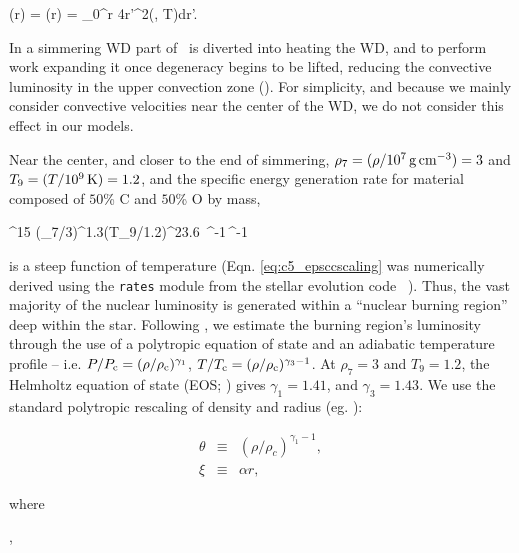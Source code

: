 \eqbegin
\Lconv(r) = \Lcc(r) = \int_0^{r} 4\pi r'^2\rho \epscc(\rho, T)dr'.
\label{eq:c5_convlum}
\eqend

\noindent In a simmering WD part of \Lcc\ is diverted into heating the WD, and to perform work expanding it once degeneracy begins to be lifted, reducing the convective luminosity in the upper convection zone (\citeal{piroc08}).  For simplicity, and because we mainly consider convective velocities near the center of the WD, we do not consider this effect in our models.  

Near the center, and closer to the end of simmering, $\rho_7 = (\rho/10^7\,\gcc) = 3$ and $T_9 = (T/10^9\,\mathrm{K}) = 1.2$, and the specific energy generation rate {\charles for material composed of $50$\% C and $50$\% O by mass,}

\eqbegin
\epscc {}^{15} \left(\rho_7/3\right)^{1.3}\left(T_9/1.2\right)^{23.6}\,\,\,^{-1}\,^{-1}
\label{eq:c5_epsccscaling}
\eqend

\noindent is a steep function of temperature (Eqn. \ref{eq:c5_epsccscaling} was numerically derived using the \texttt{rates} module from the stellar evolution code \mesa\ \citep{paxt+11}).  Thus, the vast majority of the nuclear luminosity is generated within a ``nuclear burning region'' deep within the star.  Following \citeal{wooswk04}, we estimate the burning region's luminosity through the use of a polytropic equation of state and an adiabatic temperature profile -- i.e. $P/P_\mrm{c} = (\rho/\rhoc)^{\gamma_1}$, $T/\Tc = (\rho/\rhoc)^{\gamma_3-1}$.  At $\rho_7 = 3$ and $T_9 = 1.2$, the Helmholtz equation of state (EOS; \citealt{timms00}) gives $\gamma_1 = 1.41$, and $\gamma_3 = 1.43$.  We use the standard polytropic rescaling of density and radius (eg. \citealt{kippww12}): 

\begin{eqnarray}
\theta &\equiv& (\rho/\rho_c)^{\gamma_1 - 1}, \nonumber \\
\xi &\equiv& \alpha r,
\label{eq:c5_poly_def}
\end{eqnarray}

\noindent where

\eqbegin
\alpha \equiv {},
\label{eq:c5_poly_alpha}
\eqend


